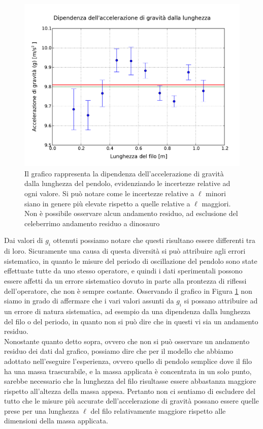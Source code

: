 \begin{figure}
	\centering
	\includegraphics[width=120mm]{immagini/gravita.pdf}
	\caption{Il grafico rappresenta la dipendenza dell'accelerazione di gravità dalla lunghezza del pendolo, evidenziando le incertezze relative ad ogni valore. Si può notare come le incertezze relative a $\ell$ minori siano in genere più elevate rispetto a quelle relative a $\ell$ maggiori. Non è possibile osservare alcun andamento residuo, ad esclusione del celeberrimo andamento residuo a dinosauro}
	\label{fig:graf_gravita}
\end{figure}

Dai valori di $g_i$ ottenuti possiamo notare che questi risultano essere differenti tra di loro. Sicuramente una causa di questa diversità si può attribuire agli errori sistematico, in quanto le misure del periodo di oscillazione del pendolo sono state effettuate tutte da uno stesso operatore, e quindi i dati sperimentali possono essere affetti da un errore sistematico dovuto in parte alla prontezza di riflessi dell'operatore, che non è sempre costante. %
Osservando il grafico in Figura \ref{fig:graf_gravita} non siamo in grado di affermare che i vari valori assunti da $g_i$ si possano attribuire ad un errore di natura sistematica, ad esempio da una dipendenza dalla lunghezza del filo o del periodo, in quanto non si può dire che in questi vi sia un andamento residuo.\\
Nonostante quanto detto sopra, ovvero che non si può osservare un andamento residuo dei dati dal grafico, possiamo dire che per il modello che abbiamo adottato nell'eseguire l'esperienza, ovvero quello di pendolo semplice dove il filo ha una massa trascurabile, e la massa applicata è concentrata in un solo punto, sarebbe necessario che la lunghezza del filo risultasse essere abbastanza maggiore rispetto all'altezza della massa appesa. Pertanto non ci sentiamo di escludere del tutto che le misure più accurate dell'accelerazione di gravità possano essere quelle prese per una lunghezza $\ell$ del filo relativamente maggiore rispetto alle dimensioni della massa applicata.
